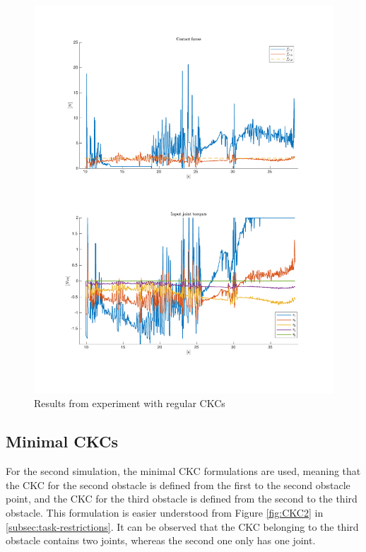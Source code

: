 \begin{figure}[H]
    \centering
    \includegraphics[trim=2cm 2cm 2cm 2cm, clip=true, width=\textwidth]{figures/experiments/2xf/bigJ-2plot.pdf}
    \caption{Results from experiment with regular CKCs}
    \label{fig:2xf-bigJ}
\end{figure}

\subsection{Minimal CKCs}

For the second simulation, the minimal CKC formulations are used, meaning that the CKC for the second obstacle is defined from the first to the second obstacle point, and the CKC for the third obstacle is defined from the second to the third obstacle. This formulation is easier understood from Figure \ref{fig:CKC2} in \ref{subsec:task-restrictions}. It can be observed that the CKC belonging to the third obstacle contains two joints, whereas the second one only has one joint.

